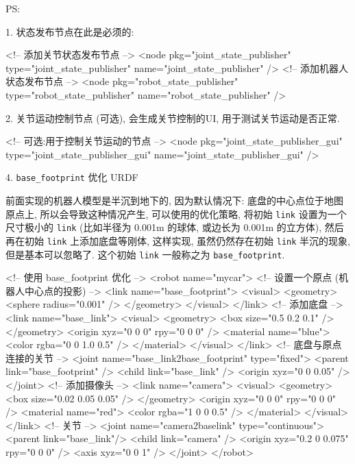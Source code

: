 \documentclass[openany, fontset=windowsold]{ctexbook}
\theoremstyle{kaiti}
\theoremstyle{normal}
\begin{document}
PS:

1. 状态发布节点在此是必须的:

\begin{xml}
  <!-- 添加关节状态发布节点 -->
  <node pkg="joint_state_publisher" type="joint_state_publisher" name="joint_state_publisher" />
  <!-- 添加机器人状态发布节点 -->
  <node pkg="robot_state_publisher" type="robot_state_publisher" name="robot_state_publisher" />
\end{xml}

2. 关节运动控制节点 (可选), 会生成关节控制的UI, 用于测试关节运动是否正常.

\begin{xml}
  <!-- 可选:用于控制关节运动的节点 -->
  <node pkg="joint_state_publisher_gui" type="joint_state_publisher_gui" name="joint_state_publisher_gui" />
\end{xml}

4. \verb|base_footprint| 优化 URDF

前面实现的机器人模型是半沉到地下的, 因为默认情况下: 底盘的中心点位于地图原点上, 所以会导致这种情况产生, 可以使用的优化策略, 将初始 \verb|link| 设置为一个尺寸极小的 \verb|link| (比如半径为 0.001m 的球体, 或边长为 0.001m 的立方体), 然后再在初始 \verb|link| 上添加底盘等刚体, 这样实现, 虽然仍然存在初始 \verb|link| 半沉的现象, 但是基本可以忽略了. 这个初始 \verb|link| 一般称之为 \verb|base_footprint|.

\begin{xml}
  <!-- 使用 base_footprint 优化 -->
  <robot name="mycar">
      <!-- 设置一个原点 (机器人中心点的投影) -->
      <link name="base_footprint">
          <visual>
              <geometry>
                  <sphere radius="0.001" />
              </geometry>
          </visual>
      </link>
      <!-- 添加底盘 -->
      <link name="base_link">
          <visual>
              <geometry>
                  <box size="0.5 0.2 0.1" />
              </geometry>
              <origin xyz="0 0 0" rpy="0 0 0" />
              <material name="blue">
                  <color rgba="0 0 1.0 0.5" />
              </material>
          </visual>
      </link>
      <!-- 底盘与原点连接的关节 -->
      <joint name="base_link2base_footprint" type="fixed">
          <parent link="base_footprint" />
          <child link="base_link" />
          <origin xyz="0 0 0.05" />
      </joint>
      <!-- 添加摄像头 -->
      <link name="camera">
          <visual>
              <geometry>
                  <box size="0.02 0.05 0.05" />
              </geometry>
              <origin xyz="0 0 0" rpy="0 0 0" />
              <material name="red">
                  <color rgba="1 0 0 0.5" />
              </material>
          </visual>
      </link>
      <!-- 关节 -->
      <joint name="camera2baselink" type="continuous">
          <parent link="base_link"/>
          <child link="camera" />
          <origin xyz="0.2 0 0.075" rpy="0 0 0" />
          <axis xyz="0 0 1" />
      </joint>
  </robot>
\end{xml}
\end{document}
